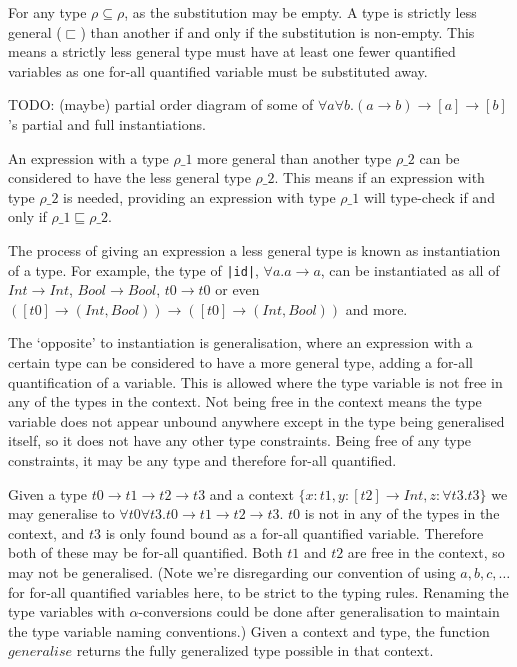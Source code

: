 \documentclass[a4paper,fleqn,12pt]{article}
\begin{document}
For any type $\rho \subseteq \rho$, as the substitution may be empty. A type is strictly less general ($\sqsubset$) than another if and only if the substitution is non-empty. This means a strictly less general type must have at least one fewer quantified variables as one for-all quantified variable must be substituted away.

TODO: (maybe) partial order diagram of some of $\forall a \forall b. (a \rightarrow b) \rightarrow [a] \rightarrow [b]$’s partial and full instantiations.

An expression with a type $\rho\_1$ more general than another type $\rho\_2$ can be considered to have the less general type $\rho\_2$. This means if an expression with type $\rho\_2$ is needed, providing an expression with type $\rho\_1$ will type-check if and only if $\rho\_1 \sqsubseteq \rho\_2$.

The process of giving an expression a less general type is known as instantiation of a type. For example, the type of \texttt{|id|}, $\forall a. a \rightarrow a$, can be instantiated as all of $Int \rightarrow Int$, $Bool \rightarrow Bool$, $t0 \rightarrow t0$ or even $([t0] \rightarrow (Int, Bool)) \rightarrow ([t0] \rightarrow (Int, Bool))$ and more.

The ‘opposite’ to instantiation is generalisation, where an expression with a certain type can be considered to have a more general type, adding a for-all quantification of a variable. This is allowed where the type variable is not free in any of the types in the context. Not being free in the context means the type variable does not appear unbound anywhere except in the type being generalised itself, so it does not have any other type constraints. Being free of any type constraints, it may be any type and therefore for-all quantified.

Given a type $t0 \rightarrow t1 \rightarrow t2 \rightarrow t3$ and a context $\{ x : t1, y : [t2] \rightarrow Int, z: \forall t3. t3 \}$ we may generalise to $\forall t0 \forall t3. t0 \rightarrow t1 \rightarrow t2 \rightarrow t3$. $t0$ is not in any of the types in the context, and $t3$ is only found bound as a for-all quantified variable. Therefore both of these may be for-all quantified. Both $t1$ and $t2$ are free in the context, so may not be generalised. (Note we’re disregarding our convention of using $a, b, c, \dots$ for for-all quantified variables here, to be strict to the typing rules. Renaming the type variables with $\alpha$-conversions could be done after generalisation to maintain the type variable naming conventions.) Given a context and type, the function $generalise$ returns the fully generalized type possible in that context.
\end{document}
